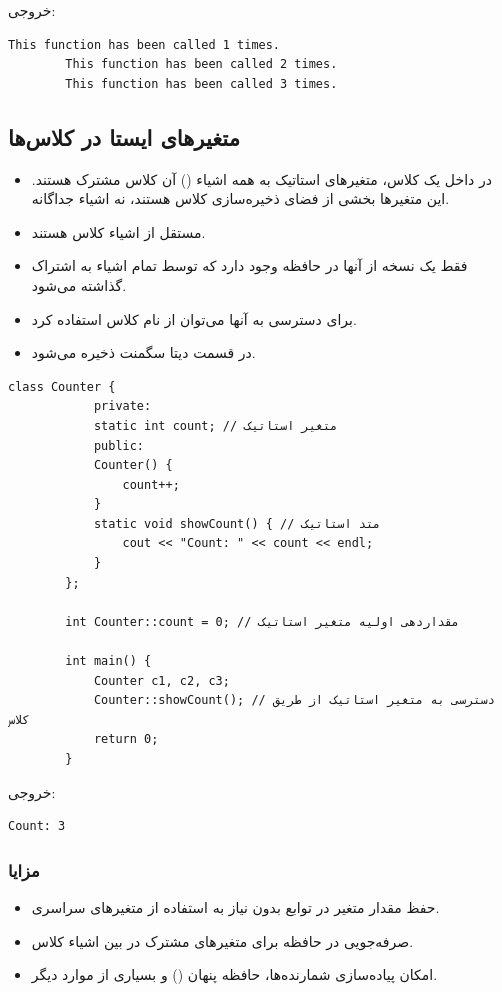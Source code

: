 \documentclass[12pt, a4paper]{report}
\begin{document}
خروجی:

\begin{LTR} %
	\begin{lstlisting}[breaklines=true]
		This function has been called 1 times.
		This function has been called 2 times.
		This function has been called 3 times.
	\end{lstlisting}
\end{LTR}


\subsection{متغیرهای ایستا در کلاس‌ها}
\begin{itemize}
	\item در داخل یک کلاس، متغیرهای استاتیک به همه اشیاء () آن کلاس مشترک هستند. این متغیرها بخشی از فضای ذخیره‌سازی کلاس هستند، نه اشیاء جداگانه.
	\item مستقل از اشیاء کلاس هستند.
	\item فقط یک نسخه از آنها در حافظه وجود دارد که توسط تمام اشیاء به اشتراک گذاشته می‌شود.
	\item برای دسترسی به آنها می‌توان از نام کلاس استفاده کرد.
	\item در قسمت دیتا سگمنت ذخیره می‌شود.
\end{itemize}


\begin{LTR} %
	\begin{lstlisting}[breaklines=true]
		class Counter {
			private:
			static int count; // متغیر استاتیک
			public:
			Counter() {
				count++;
			}
			static void showCount() { // متد استاتیک
				cout << "Count: " << count << endl;
			}
		};
		
		int Counter::count = 0; // مقداردهی اولیه متغیر استاتیک
		
		int main() {
			Counter c1, c2, c3;
			Counter::showCount(); // دسترسی به متغیر استاتیک از طریق کلاس
			return 0;
		}
	\end{lstlisting}
\end{LTR}

خروجی:

\begin{LTR} %
	\begin{lstlisting}[breaklines=true]
		Count: 3
	\end{lstlisting}
\end{LTR}

\subsubsection{مزایا}
\begin{itemize}
	\item حفظ مقدار متغیر در توابع بدون نیاز به استفاده از متغیرهای سراسری.
	\item صرفه‌جویی در حافظه برای متغیرهای مشترک در بین اشیاء کلاس.
	\item امکان پیاده‌سازی شمارنده‌ها، حافظه پنهان () و بسیاری از موارد دیگر.
\end{itemize}
\end{document}
